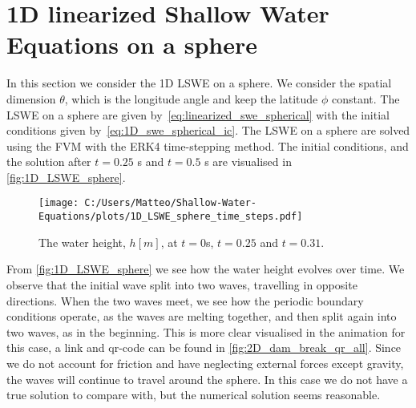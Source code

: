 \section{1D linearized Shallow Water Equations on a sphere}\label{sec:1D_sphere}
In this section we consider the 1D LSWE on a sphere.
We consider the spatial dimension $\theta$, which is the longitude angle and keep the latitude $\phi$ constant.
The LSWE on a sphere are given by~\eqref{eq:linearized_swe_spherical} with the initial conditions given by~\eqref{eq:1D_swe_spherical_ic}.
The LSWE on a sphere are solved using the FVM with the ERK4 time-stepping method.
The initial conditions, and the solution after $t = 0.25$ s and $t = 0.5$ s are visualised in \autoref{fig:1D_LSWE_sphere}.
\begin{figure}[H]
    \centering
    \texttt{[image: C:/Users/Matteo/Shallow-Water-Equations/plots/1D\_LSWE\_sphere\_time\_steps.pdf]}
    \caption{The water height, $h[m]$, at $t = 0$s, $t = 0.25$ and $t = 0.31$.}\label{fig:1D_LSWE_sphere}
\end{figure}
From \autoref{fig:1D_LSWE_sphere} we see how the water height evolves over time.
We observe that the initial wave split into two waves, travelling in opposite directions.
When the two waves meet, we see how the periodic boundary conditions operate, as the waves are melting together, and then split again into two waves, as in the beginning.
This is more clear visualised in the animation for this case, a link and qr-code can be found in \autoref{fig:2D_dam_break_qr_all}.
Since we do not account for friction and have neglecting external forces except gravity, the waves will continue to travel around the sphere.
In this case we do not have a true solution to compare with, but the numerical solution seems reasonable.

